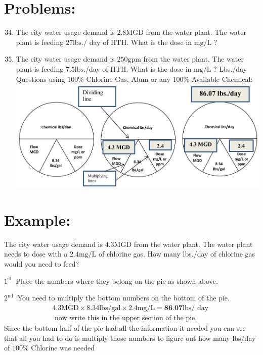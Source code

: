 \documentclass[10pt]{article}
\begin{document}
\section{Problems:}
\begin{enumerate}
  \setcounter{enumi}{33}
  \item The city water usage demand is $2.8 \mathrm{MGD}$ from the water plant. The water plant is feeding $27 \mathrm{lbs} . /$ day of $\mathrm{HTH}$. What is the dose in $\mathrm{mg} / \mathrm{L}$ ?

  \item The city water usage demand is $250 \mathrm{gpm}$ from the water plant. The water plant is feeding $7.5 \mathrm{lbs}$./day of $\mathrm{HTH}$. What is the dose in $\mathrm{mg} / \mathrm{L}$ ? Lbs./day Questions using $100 \%$ Chlorine Gas, Alum or any $100 \%$ Available Chemical:\\

\includegraphics[max width=\textwidth]{2022_09_16_0c6b804a9b26a8df4e8fg-10}

\end{enumerate}
\section{Example:}
The city water usage demand is $4.3 \mathrm{MGD}$ from the water plant. The water plant needs to dose with a $2.4 \mathrm{mg} / \mathrm{L}$ of chlorine gas. How many lbs./day of chlorine gas would you need to feed?

$1^{\text {st }}$ Place the numbers where they belong on the pie as shown above.

$2^{\text {nd }}$ You need to multiply the bottom numbers on the bottom of the pie.
$$
\begin{array}{r}
4.3 \mathrm{MGD} \times 8.34 \mathrm{lbs} / \mathrm{gal} \times 2.4 \mathrm{mg} / \mathrm{L}=\mathbf{8 6 . 0 7} \mathrm{lbs} / \text { day } \\
\text { now write this in the upper section of the pie. }
\end{array}
$$
Since the bottom half of the pie had all the information it needed you can see that all you had to do is multiply those numbers to figure out how many lbs/day of $100 \%$ Chlorine was needed
\end{document}
